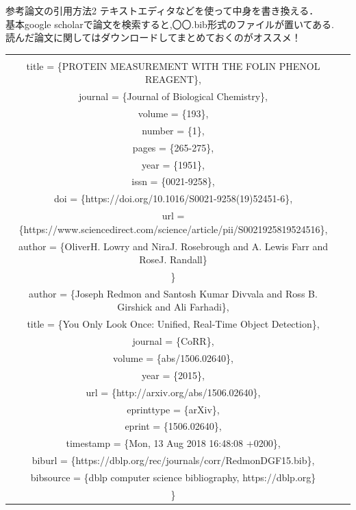 \documentclass[aspectratio=169, dvipdfmx, 12pt]{beamer}
\begin{document}
\begin{frame}{参考論文の引用方法2}
    テキストエディタなどを使って中身を書き換える．\\
    {\color{red}基本google scholarで論文を検索すると,〇〇.bib形式のファイルが置いてある.\\
    読んだ論文に関してはダウンロードしてまとめておくのがオススメ！}
    \begin{tabular}{cc}
      \begin{minipage}[t]{0.45\hsize}
        \fontsize{5pt}{0cm}\selectfont{@article\{LOWRY1951265,\\
        title = \{PROTEIN MEASUREMENT WITH THE FOLIN PHENOL REAGENT\},\\
        journal = \{Journal of Biological Chemistry\},\\
        volume = \{193\},\\
        number = \{1\},\\
        pages = \{265-275\},\\
        year = \{1951\},\\
        issn = \{0021-9258\},\\
        doi = \{https://doi.org/10.1016/S0021-9258(19)52451-6\},\\
        url = \{https://www.sciencedirect.com/science/article/pii/S0021925819524516\},\\
        author = \{OliverH. Lowry and NiraJ. Rosebrough and A. Lewis Farr and RoseJ. Randall\}\\
        \}}
      \end{minipage} 
      \begin{minipage}[t]{0.45\hsize}
        \fontsize{5pt}{0cm}\selectfont{@article\{Yolo,\\
        author       = \{Joseph Redmon and Santosh Kumar Divvala and Ross B. Girshick and Ali Farhadi\},\\
        title        = \{You Only Look Once: Unified, Real-Time Object Detection\},\\
        journal      = \{CoRR\},\\
        volume       = \{abs/1506.02640\},\\
        year         = \{2015\},\\
        url          = \{http://arxiv.org/abs/1506.02640\},\\
        eprinttype    = \{arXiv\},\\
        eprint       = \{1506.02640\},\\
        timestamp    = \{Mon, 13 Aug 2018 16:48:08 +0200\},\\
        biburl       = \{https://dblp.org/rec/journals/corr/RedmonDGF15.bib\},\\
        bibsource    = \{dblp computer science bibliography, https://dblp.org\}\\
        \}}
      \end{minipage} 
    \end{tabular}
\end{frame}
\end{document}
